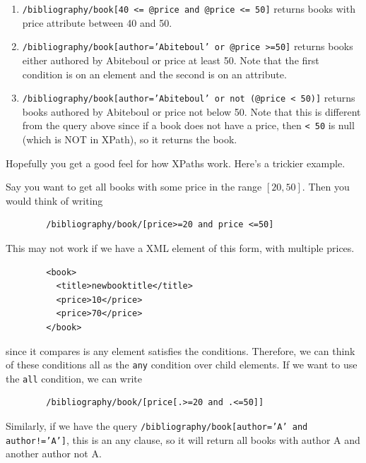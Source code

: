 \documentclass{article}
\begin{document}
\begin{example}
\begin{enumerate}
        \item \texttt{/bibliography/book[40 <= @price and @price <= 50]} returns books with price attribute between 40 and 50. 

        \item \texttt{/bibliography/book[author='Abiteboul' or @price >=50]} returns books either authored by Abiteboul or price at least 50. Note that the first condition is on an element and the second is on an attribute. 

        \item \texttt{/bibliography/book[author='Abiteboul' or not (@price < 50)]} returns books authored by Abiteboul or price not below 50. Note that this is different from the query above since if a book does not have a price, then \texttt{\@price < 50} is null (which is NOT in XPath), so it returns the book. 
      \end{enumerate}
    \end{example}

    Hopefully you get a good feel for how XPaths work. Here's a trickier example. 

    \begin{example}
      Say you want to get all books with some price in the range $[20, 50]$. Then you would think of writing 
      \begin{lstlisting}
        /bibliography/book/[price>=20 and price <=50]
      \end{lstlisting}
      This may not work if we have a XML element of this form, with multiple prices. 
      \begin{lstlisting}
        <book> 
          <title>newbooktitle</title>
          <price>10</price>
          <price>70</price> 
        </book>
      \end{lstlisting} 
      since it compares is any element satisfies the conditions. Therefore, we can think of these conditions all as the \texttt{any} condition over child elements. If we want to use the \texttt{all} condition, we can write 
      \begin{lstlisting}
        /bibliography/book/[price[.>=20 and .<=50]]
      \end{lstlisting}

      Similarly, if we have the query \texttt{/bibliography/book[author='A' and author!='A']}, this is an any clause, so it will return all books with author A and another author not A. 
    \end{example}
\end{document}
